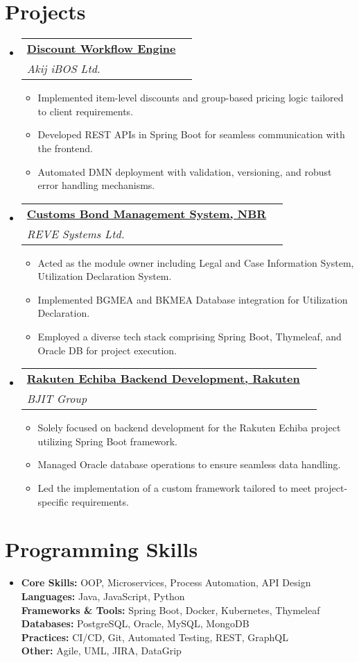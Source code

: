 \documentclass[a4paper,11pt]{article}
\makeatletter
\newcommand{\resumeItem}[1]{\item[$\bullet$] \small{#1 \vspace{-2pt}}}
\newcommand{\resumeSubHeadingListStart}{\begin{itemize}[leftmargin=0pt, label={}]}
\newcommand{\resumeSubHeadingListEnd}{\end{itemize}}
\newcommand{\resumeItemListStart}{\begin{itemize}}
\newcommand{\resumeItemListEnd}{\end{itemize}\vspace{-5pt}}
\newcommand{\resumeSubheading}[5]{
    \vspace{-1pt}\item
    \begin{tabular*}{1\textwidth}{l@{\extracolsep{\fill}}r}
    \textbf{\href{#4}{#1}} & #2 \\
    \textit{\small#3} & \textit{\small #5} \\
    \end{tabular*}\vspace{-5pt}
}
\makeatother
\begin{document}
    \section{Projects}
    \resumeSubHeadingListStart
    \resumeSubheading
    {Discount Workflow Engine}{}
    {Akij iBOS Ltd.}{https://ibos.io/}{}
    \resumeItemListStart
        \resumeItem{Implemented item-level discounts and group-based pricing logic tailored to client requirements.}
        \resumeItem{Developed REST APIs in Spring Boot for seamless communication with the frontend.}
        \resumeItem{Automated DMN deployment with validation, versioning, and robust error handling mechanisms.}
    \resumeItemListEnd
    \resumeSubheading
        {Customs Bond Management System, NBR}{}
        {REVE Systems Ltd.}{https://cusbond.gov.bd/}{}
    \resumeItemListStart
        \resumeItem{Acted as the module owner including Legal and Case Information System, Utilization Declaration System.}
        \resumeItem{Implemented BGMEA and BKMEA Database integration for Utilization Declaration.}
        \resumeItem{Employed a diverse tech stack comprising Spring Boot, Thymeleaf, and Oracle DB for project execution.}
    \resumeItemListEnd
    \resumeSubheading
        {Rakuten Echiba Backend Development, Rakuten}{}
        {BJIT Group}{https://www.rakuten.co.jp/}{}
    \resumeItemListStart
        \resumeItem{Solely focused on backend development for the Rakuten Echiba project utilizing Spring Boot framework.}
        \resumeItem{Managed Oracle database operations to ensure seamless data handling.}
        \resumeItem{Led the implementation of a custom framework tailored to meet project-specific requirements.}
    \resumeItemListEnd
    \resumeSubHeadingListEnd

    \section{Programming Skills}
    \resumeSubHeadingListStart
    \item{
        \textbf{Core Skills:} OOP, Microservices, Process Automation, API Design \\
        \textbf{Languages:} Java, JavaScript, Python \\
        \textbf{Frameworks \& Tools:} Spring Boot, Docker, Kubernetes, Thymeleaf \\
        \textbf{Databases:} PostgreSQL, Oracle, MySQL, MongoDB \\
        \textbf{Practices:} CI/CD, Git, Automated Testing, REST, GraphQL \\
        \textbf{Other:} Agile, UML, JIRA, DataGrip
    }
    \resumeSubHeadingListEnd
\end{document}

